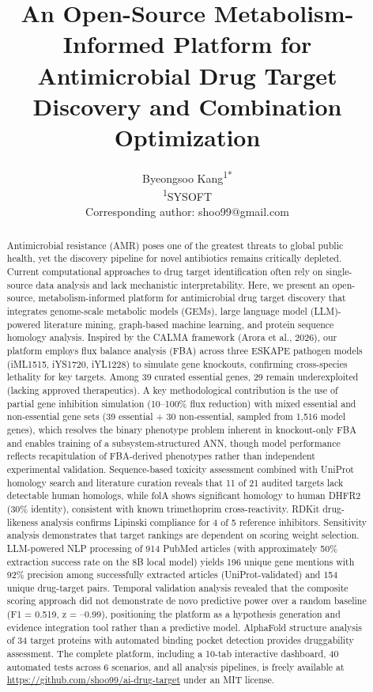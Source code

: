 \documentclass[12pt,a4paper]{article}
\title{An Open-Source Metabolism-Informed Platform for Antimicrobial Drug Target Discovery and Combination Optimization}
\author{
Byeongsoo Kang\textsuperscript{1*}\\
\small\textsuperscript{1}SYSOFT\\
\small *Corresponding author: shoo99@gmail.com
}
\date{}
\begin{document}
\maketitle

\begin{abstract}
Antimicrobial resistance (AMR) poses one of the greatest threats to global public health, yet the discovery pipeline for novel antibiotics remains critically depleted. Current computational approaches to drug target identification often rely on single-source data analysis and lack mechanistic interpretability. Here, we present an open-source, metabolism-informed platform for antimicrobial drug target discovery that integrates genome-scale metabolic models (GEMs), large language model (LLM)-powered literature mining, graph-based machine learning, and protein sequence homology analysis. Inspired by the CALMA framework (Arora et al., 2026), our platform employs flux balance analysis (FBA) across three ESKAPE pathogen models (iML1515, iYS1720, iYL1228) to simulate gene knockouts, confirming cross-species lethality for key targets. Among 39 curated essential genes, 29 remain underexploited (lacking approved therapeutics). A key methodological contribution is the use of partial gene inhibition simulation (10--100\% flux reduction) with mixed essential and non-essential gene sets (39 essential + 30 non-essential, sampled from 1,516 model genes), which resolves the binary phenotype problem inherent in knockout-only FBA and enables training of a subsystem-structured ANN, though model performance reflects recapitulation of FBA-derived phenotypes rather than independent experimental validation. Sequence-based toxicity assessment combined with UniProt homology search and literature curation reveals that 11 of 21 audited targets lack detectable human homologs, while folA shows significant homology to human DHFR2 (30\% identity), consistent with known trimethoprim cross-reactivity. RDKit drug-likeness analysis confirms Lipinski compliance for 4 of 5 reference inhibitors. Sensitivity analysis demonstrates that target rankings are dependent on scoring weight selection. LLM-powered NLP processing of 914 PubMed articles (with approximately 50\% extraction success rate on the 8B local model) yields 196 unique gene mentions with 92\% precision among successfully extracted articles (UniProt-validated) and 154 unique drug-target pairs. Temporal validation analysis revealed that the composite scoring approach did not demonstrate de novo predictive power over a random baseline (F1 = 0.519, z = --0.99), positioning the platform as a hypothesis generation and evidence integration tool rather than a predictive model. AlphaFold structure analysis of 34 target proteins with automated binding pocket detection provides druggability assessment. The complete platform, including a 10-tab interactive dashboard, 40 automated tests across 6 scenarios, and all analysis pipelines, is freely available at \url{https://github.com/shoo99/ai-drug-target} under an MIT license.


\end{abstract}
\end{document}
